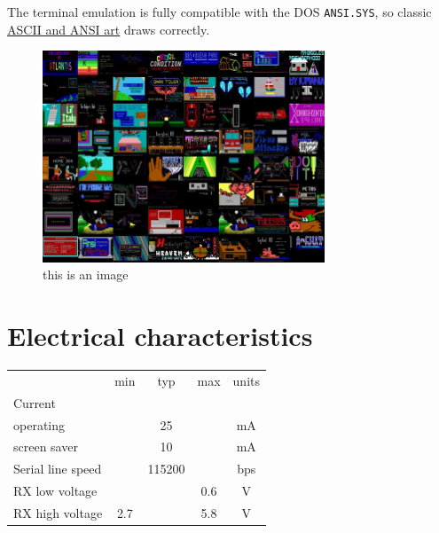 \documentclass{article}
\begin{document}
The terminal emulation is fully compatible with the DOS
\texttt{ANSI.SYS}, so classic
\href{http://artscene.textfiles.com/ansi/}{ASCII and ANSI art} draws
correctly.

\begin{figure}[H]
  \centering
  \caption{this is an image}
  \includegraphics[width=0.75\textwidth]{img/img5}
\end{figure}

\hypertarget{technical-specifications}{}
\hypertarget{technical-specifications}{%
\section{Electrical characteristics}\label{electrical-characteristics}}

\vspace{10 pt}
\newcommand{\heavyline}{\specialrule{1pt}{1pt}{1pt}}
\setlength{\tabcolsep}{20pt}
{\renewcommand{\arraystretch}{1.2}%

\begin{tabularx}{\linewidth}{Xcccc}
\heavyline
& min & typ & max & units \\ \heavyline

Current & & & & \\
\hspace{10pt} operating & & 25 & & mA \\
\hspace{10pt} screen saver & & 10 & & mA \\ \hline

Serial line speed & & 115200 & & bps \\ \hline
RX low voltage & & & 0.6 & V \\ \hline
RX high voltage & 2.7 &   & 5.8 & V \\ \hline
\end{tabularx}}
\vspace{10 pt}
\end{document}
